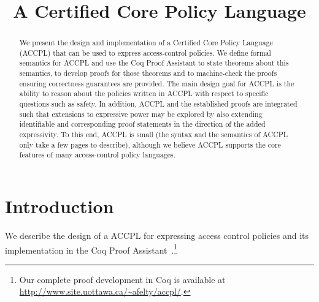 \documentclass[conference]{IEEEtran}
\begin{document}
\title{A Certified Core Policy Language}

\author{
}

\maketitle

\begin{abstract}
  We present the design and implementation of a Certified Core Policy
  Language (ACCPL) that can be used to express access-control
  policies.  We define formal semantics for ACCPL and use the Coq
  Proof Assistant to state theorems about this semantics, to develop
  proofs for those theorems and to machine-check the proofs ensuring
  correctness guarantees are provided. The main design goal for ACCPL
  is the ability to reason about the policies written in ACCPL with
  respect to specific questions such as safety. In addition, ACCPL and
  the established proofs are integrated such that extensions to
  expressive power may be explored by also extending identifiable and
  corresponding proof statements in the direction of the added
  expressivity.  To this end, ACCPL is small (the syntax and the
  semantics of ACCPL only take a few pages to describe), although we
  believe ACCPL supports the core features of many access-control
  policy languages.
\end{abstract}


\section{Introduction}\label{sec:intro}
We describe the design of a \ac{ACCPL} 
for expressing access control policies
%
and its implementation in the Coq Proof Assistant~\cite{BC04}.\footnote{Our complete proof development in Coq is available at
\url{http://www.site.uottawa.ca/~afelty/accpl/}.}
\end{document}
